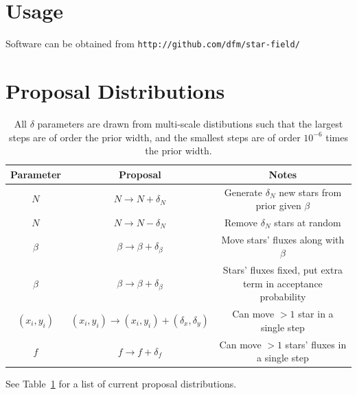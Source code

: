 \documentclass[manuscript]{aastex}
\begin{document}
\section{Usage}
Software can be obtained from {\tt http://github.com/dfm/star-field/}

\section{Proposal Distributions}

\begin{table}
\begin{center}
\begin{tabular}{|c|c|c|}
\hline
Parameter & Proposal & Notes\\
\hline
$N$ & $N \to N + \delta_N$ & Generate $\delta_N$ new stars from prior given
$\beta$\\
$N$ & $N \to N - \delta_N$ & Remove $\delta_N$ stars at random\\
$\beta$ & $\beta \to \beta + \delta_\beta$ & Move stars' fluxes along with
$\beta$\\
$\beta$ & $\beta \to \beta + \delta_\beta$ & Stars' fluxes fixed, put extra
term in acceptance probability \\
$(x_i,y_i)$ & $(x_i,y_i) \to (x_i,y_i)+(\delta_x, \delta_y)$ & Can move $>1$ star
in a single step \\
$f$ & $f \to f + \delta_f$ & Can move $>1$ stars' fluxes in a single step\\
\hline
\end{tabular}
\end{center}
\caption{All $\delta$ parameters are drawn from multi-scale distibutions such
that the largest steps are of order the prior width, and the smallest steps
are of order $10^{-6}$ times the prior width.\label{proposals}}
\end{table}

See Table~\ref{proposals} for a list of current proposal distributions.




\end{document}
